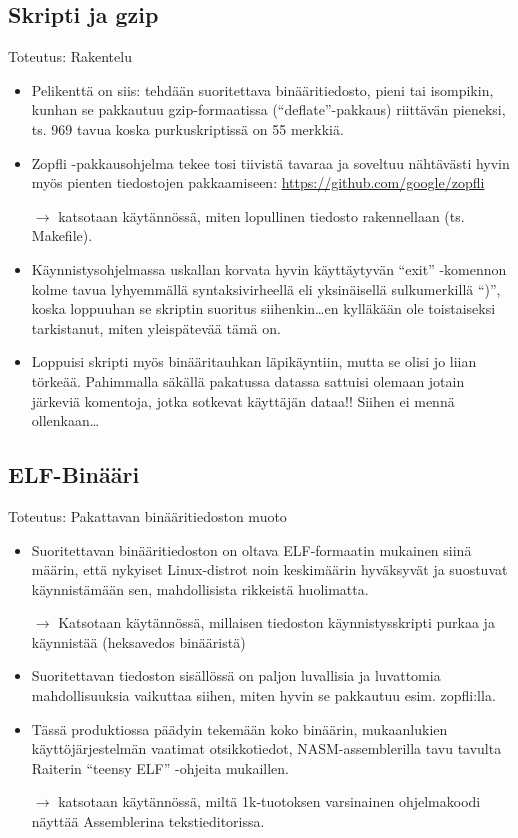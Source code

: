 \documentclass[pdf,10pt]{beamer}
\begin{document}
\subsection{Skripti ja gzip}
\begin{frame}{Toteutus: Rakentelu}
  \begin{itemize}
    \item Pelikenttä on siis: tehdään suoritettava binääritiedosto,
      pieni tai isompikin, kunhan se pakkautuu gzip-formaatissa
      (``deflate''-pakkaus) riittävän pieneksi, ts. 969 tavua koska
      purkuskriptissä on 55 merkkiä.
    \item Zopfli -pakkausohjelma tekee tosi tiivistä tavaraa ja
      soveltuu nähtävästi hyvin myös pienten tiedostojen pakkaamiseen:
      \url{https://github.com/google/zopfli}
    \item[$\rightarrow$] katsotaan käytännössä, miten lopullinen
      tiedosto rakennellaan (ts. Makefile).
    \item Käynnistysohjelmassa uskallan korvata hyvin käyttäytyvän
      ``exit'' -komennon kolme tavua lyhyemmällä syntaksivirheellä eli
      yksinäisellä sulkumerkillä ``)'', koska loppuuhan se skriptin
      suoritus siihenkin\ldots en kylläkään ole toistaiseksi
      tarkistanut, miten yleispätevää tämä on.
    \item Loppuisi skripti myös binääritauhkan läpikäyntiin, mutta se
      olisi jo liian törkeää. Pahimmalla säkällä pakatussa datassa
      sattuisi olemaan jotain järkeviä komentoja, jotka sotkevat
      käyttäjän dataa!! Siihen ei mennä ollenkaan\ldots
  \end{itemize}
\end{frame}

\subsection{ELF-Binääri}
\begin{frame}{Toteutus: Pakattavan binääritiedoston muoto}
  \begin{itemize}
    \item Suoritettavan binääritiedoston on oltava ELF-formaatin
      mukainen siinä määrin, että nykyiset Linux-distrot noin
      keskimäärin hyväksyvät ja suostuvat käynnistämään sen,
      mahdollisista rikkeistä huolimatta.
    \item[$\rightarrow$] Katsotaan käytännössä, millaisen tiedoston
      käynnistysskripti purkaa ja käynnistää (heksavedos binääristä)
    \item Suoritettavan tiedoston sisällössä on paljon luvallisia ja
      luvattomia mahdollisuuksia vaikuttaa siihen, miten hyvin se
      pakkautuu esim. zopfli:lla.
    \item Tässä produktiossa päädyin tekemään koko binäärin,
      mukaanlukien käyttöjärjestelmän vaatimat otsikkotiedot,
      NASM-assemblerilla tavu tavulta Raiterin ``teensy ELF'' -ohjeita
      mukaillen.
    \item[$\rightarrow$] katsotaan käytännössä, miltä 1k-tuotoksen
      varsinainen ohjelmakoodi näyttää Assemblerina tekstieditorissa.
  \end{itemize}
\end{frame}
\end{document}
